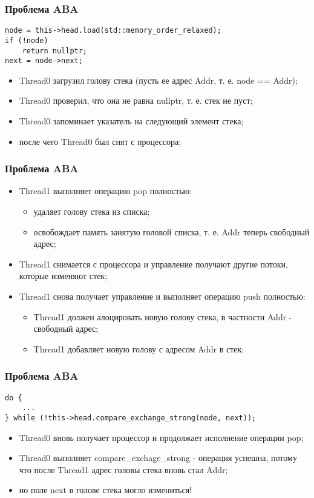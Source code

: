 \begin{frame}[fragile]
\frametitle{Проблема ABA}

\begin{lstlisting}
node = this->head.load(std::memory_order_relaxed);
if (!node)
    return nullptr;
next = node->next;
\end{lstlisting}

\begin{itemize}
  \item Thread0 загрузил голову стека (пусть ее адрес Addr, т. е. node == Addr);
  \item Thread0 проверил, что она не равна nullptr, т. е. стек не пуст;
  \item Thread0 запоминает указатель на следующий элемент стека;
  \item после чего Thread0 был снят с процессора;
\end{itemize}
\end{frame}

\begin{frame}
\frametitle{Проблема ABA}

\begin{itemize}
  \item Thread1 выполняет операцию pop полностью:
    \begin{itemize}
      \item удаляет голову стека из списка;
      \item освобождает память занятую головой списка, т. е. Addr теперь свободный адрес;
    \end{itemize}
  \item Thread1 снимается с процессора и управление получают другие потоки, которые изменяют стек;
  \item Thread1 снова получает управление и выполняет операцию push полностью:
    \begin{itemize}
      \item Thread1 должен алоцировать новую голову стека, в частности Addr - свободный адрес;
      \item Thread1 добавляет новую голову с адресом Addr в стек;
    \end{itemize}
\end{itemize}
\end{frame}

\begin{frame}[fragile]
\frametitle{Проблема ABA}

\begin{lstlisting}
do {
    ...
} while (!this->head.compare_exchange_strong(node, next));
\end{lstlisting}

\begin{itemize}
  \item Thread0 вновь получает процессор и продолжает исполнение операции pop;
  \item Thread0 выполняет compare\_exchage\_strong - операция успешна, потому что после Thread1 адрес головы стека вновь стал Addr;
  \item<2-> но поле next в голове стека могло измениться!
\end{itemize}
\end{frame}
